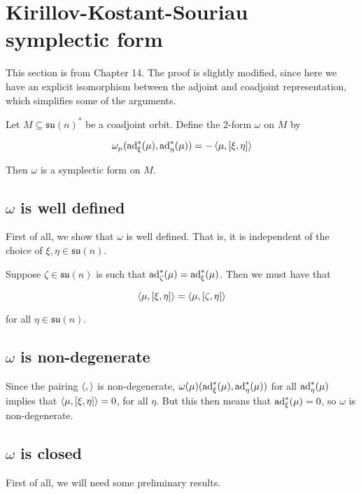 \documentclass{article}
\newcommand{\su}{\mathfrak{su}}
\begin{document}
\section{Kirillov-Kostant-Souriau symplectic form}

This section is from \cite{marsden_ratiu} Chapter 14. The proof is slightly modified, since here we have an explicit isomorphism between the adjoint and coadjoint representation, which simplifies some of the arguments.

\begin{theorem}
    \label{thm:kks}
    Let \(M \subseteq \su(n)^*\) be a coadjoint orbit. Define the \(2\)-form \(\omega\) on \( M\) by

    \[\omega_\mu(\operatorname{ad}_\xi^*(\mu), \operatorname{ad}_\eta^*(\mu)) = -\left\langle \mu, [\xi, \eta] \right\rangle\]

    Then \(\omega\) is a symplectic form on \( M\).
\end{theorem}

\subsection{\(\omega\) is well defined}

First of all, we show that \(\omega\) is well defined. That is, it is independent of the choice of \(\xi, \eta \in \su(n)\).

Suppose \(\zeta \in \su(n)\) is such that \(\operatorname{ad}_\zeta^*(\mu) = \operatorname{ad}_\xi^*(\mu)\). Then we must have that

\[\left\langle \mu, [\xi, \eta] \right\rangle = \left\langle \mu, [\zeta, \eta] \right\rangle\]

for all \(\eta \in \su(n)\).

\subsection{\(\omega\) is non-degenerate}

Since the pairing \(\left\langle , \right\rangle\) is non-degenerate, \(\omega(\mu)(\operatorname{ad}_\xi^*(\mu), \operatorname{ad}_\eta^*(\mu))\) for all \(\operatorname{ad}_\eta^*(\mu)\) implies that \(\left\langle \mu, [\xi, \eta] \right\rangle = 0\), for all \(\eta\). But this then means that \(\operatorname{ad}_\xi^*(\mu) = 0\), so \(\omega\) is non-degenerate.

\subsection{\(\omega\) is closed}

First of all, we will need some preliminary results.
\end{document}
